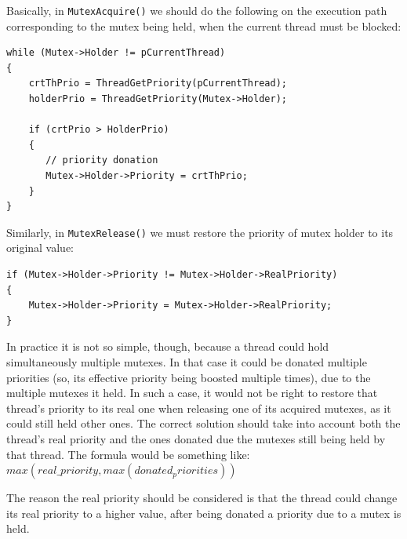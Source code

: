 Basically, in \lstinline|MutexAcquire()| we should do the following on the execution path corresponding to the mutex being held, when the current thread must be blocked:
\begin{lstlisting}
while (Mutex->Holder != pCurrentThread)    
{
    crtThPrio = ThreadGetPriority(pCurrentThread);
    holderPrio = ThreadGetPriority(Mutex->Holder);

    if (crtPrio > HolderPrio)
    {
       // priority donation
       Mutex->Holder->Priority = crtThPrio;
    }
}
\end{lstlisting}

Similarly, in \lstinline|MutexRelease()| we must restore the priority of mutex holder to its original value:
\begin{lstlisting}
if (Mutex->Holder->Priority != Mutex->Holder->RealPriority)
{
    Mutex->Holder->Priority = Mutex->Holder->RealPriority;
}
\end{lstlisting}

In practice it is not so simple, though, because a thread could hold simultaneously multiple mutexes. In that case it could be donated multiple priorities (so, its effective priority being boosted multiple times), due to the multiple mutexes it held. In such a case, it would not be right to restore that thread's priority to its real one when releasing one of its acquired mutexes, as it could still held other ones. The correct solution should take into account both the thread's real priority and the ones donated due the mutexes still being held by that thread. The formula would be something like:
$max(real\_priority, max(donated_priorities))$

The reason the real priority should be considered is that the thread could change its real priority to a higher value, after being donated a priority due to a mutex is held. 

